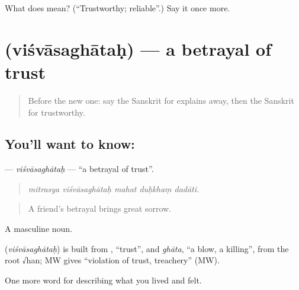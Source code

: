 \begin{tcolorbox}[breakable,colback=teal!4,colframe=teal!35!black,title={Before you move on}]
What does  mean? (\textquotedblleft{}Trustworthy; reliable\textquotedblright{}.) Say it once more.
\end{tcolorbox}
\section[\texorpdfstring{\sk{विश्वासघातः} (viśvāsaghātaḥ)}{विश्वासघातः (viśvāsaghātaḥ)}]{ (viśvāsaghātaḥ) — a betrayal of trust}

\label{lesson:SA-C462-visvasaghatah}



\begin{quote}
Before the new one: say the Sanskrit for explains away, then the Sanskrit for trustworthy.
\end{quote}

\subsection*{You'll want to know: }
\textbf{} — \emph{viśvāsaghātaḥ} — \textquotedblleft{}a betrayal of trust\textquotedblright{}.

\begin{quote}
    
\end{quote}

\begin{quote}
\emph{mitrasya viśvāsaghātaḥ mahat duḥkhaṃ dadāti.}
\end{quote}

\begin{quote}
A friend's betrayal brings great sorrow.
\end{quote}

A masculine noun.

\begin{cousinweb}
\textbf{} (\emph{viśvāsaghātaḥ}) is built from \textbf{}, \textquotedblleft{}trust\textquotedblright{}, and \emph{ghāta}, \textquotedblleft{}a blow, a killing\textquotedblright{}, from the root √han; MW gives \textquotedblleft{}violation of trust, treachery\textquotedblright{} (MW).
\end{cousinweb}

\begin{grammarlens}[title={What you've built}]
One more word for describing what you lived and felt.
\end{grammarlens}

